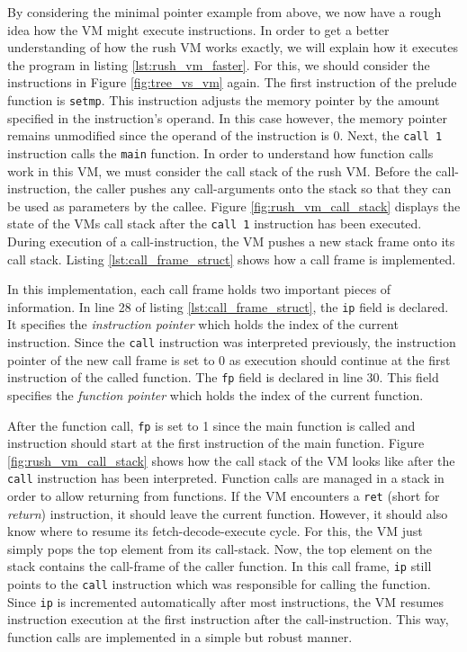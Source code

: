 By considering the minimal pointer example from above, we now have a rough idea how the VM might execute instructions.
In order to get a better understanding of how the rush VM works exactly, we will explain how it executes the program in listing \ref{lst:rush_vm_faster}.
For this, we should consider the instructions in Figure \ref{fig:tree_vs_vm} again.
The first instruction of the prelude function is \texttt{setmp}.
This instruction adjusts the memory pointer by the amount specified in the instruction's operand.
In this case however, the memory pointer remains unmodified since the operand of the instruction is 0.
Next, the \texttt{call 1} instruction calls the \texttt{main} function.
In order to understand how function calls work in this VM, we must consider the call stack of the rush VM.
Before the call-instruction, the caller pushes any call-arguments onto the stack so that they can be used as parameters by the callee.
Figure \ref{fig:rush_vm_call_stack} displays the state of the VMs call stack after the \texttt{call 1} instruction has been executed.
During execution of a call-instruction, the VM pushes a new stack frame onto its call stack.
Listing \ref{lst:call_frame_struct} shows how a call frame is implemented.


In this implementation, each call frame holds two important pieces of information.
In line 28 of listing \ref{lst:call_frame_struct}, the \texttt{ip} field is declared.
It specifies the \emph{instruction pointer} which holds the index of the current instruction.
Since the \texttt{call} instruction was interpreted previously, the instruction pointer of the new call frame is set to 0 as execution should continue at the first instruction of the called function.
The \texttt{fp} field is declared in line 30.
This field specifies the \emph{function pointer} which holds the index of the current function.

After the function call, \texttt{fp} is set to 1 since the main function is called and instruction should start at the first instruction of the main function.
Figure \ref{fig:rush_vm_call_stack} shows how the call stack of the VM looks like after the \texttt{call} instruction has been interpreted.
Function calls are managed in a stack in order to allow returning from functions.
If the VM encounters a \texttt{ret} (short for \emph{return}) instruction, it should leave the current function.
However, it should also know where to resume its fetch-decode-execute cycle.
For this, the VM just simply pops the top element from its call-stack.
Now, the top element on the stack contains the call-frame of the caller function.
In this call frame, \texttt{ip} still points to the \texttt{call} instruction which was responsible for calling the function.
Since \texttt{ip} is incremented automatically after most instructions, the VM resumes instruction execution at the first instruction after the call-instruction.
This way, function calls are implemented in a simple but robust manner.

